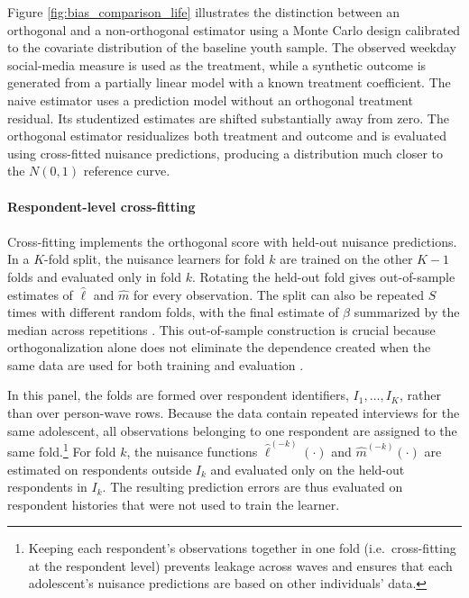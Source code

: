 \documentclass[11pt,oneside,a4paper]{book}
\begin{document}
Figure \ref{fig:bias_comparison_life} illustrates the distinction between an orthogonal and a non-orthogonal estimator using a Monte Carlo design calibrated to the covariate distribution of the baseline youth sample. The observed weekday social-media measure is used as the treatment, while a synthetic outcome is generated from a partially linear model with a known treatment coefficient. The naive estimator uses a prediction model without an orthogonal treatment residual. Its studentized estimates are shifted substantially away from zero. The orthogonal estimator residualizes both treatment and outcome and is evaluated using cross-fitted nuisance predictions, producing a distribution much closer to the \(N(0,1)\) reference curve.\\
\\
\noindent
\textbf{Respondent-level cross-fitting}
\label{sec:cross_fitting_background}\\
\\
Cross-fitting implements the orthogonal score with held-out nuisance predictions. In a \(K\)-fold split, the nuisance learners for fold \(k\) are trained on the other \(K-1\) folds and evaluated only in fold \(k\). Rotating the held-out fold gives out-of-sample estimates of \(\hat\ell\) and \(\hat m\) for every observation. The split can also be repeated \(S\) times with different random folds, with the final estimate of \(\beta\) summarized by the median across repetitions \citep{fuhr2024dml,helal2026returns}. This out-of-sample construction is crucial because orthogonalization alone does not eliminate the dependence created when the same data are used for both training and evaluation \citep{chernozhukov2018dml,bach2024doubleml}.

In this panel, the folds are formed over respondent identifiers, \(I_1,\ldots,I_K\), rather than over person-wave rows. Because the data contain repeated interviews for the same adolescent, all observations belonging to one respondent are assigned to the same fold.\footnote{Keeping each respondent’s observations together in one fold (i.e.\ cross-fitting at the respondent level) prevents leakage across waves and ensures that each adolescent’s nuisance predictions are based on other individuals' data.} For fold \(k\), the nuisance functions \(\widehat{\ell}^{(-k)}(\cdot)\) and \(\widehat{m}^{(-k)}(\cdot)\) are estimated on respondents outside \(I_k\) and evaluated only on the held-out respondents in \(I_k\). The resulting prediction errors are thus evaluated on respondent histories that were not used to train the learner.
\end{document}
